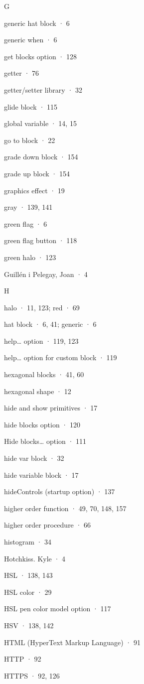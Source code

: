 G

generic hat block · 6

generic when · 6

get blocks option · 128

getter · 76

getter/setter library · 32

glide block · 115

global variable · 14, 15

go to block · 22

grade down block · 154

grade up block · 154

graphics effect · 19

gray · 139, 141

green flag · 6

green flag button · 118

green halo · 123

Guillén i Pelegay, Joan · 4

H

halo · 11, 123; red · 69

hat block · 6, 41; generic · 6

help\ldots{} option · 119, 123

help\ldots{} option for custom block · 119

hexagonal blocks · 41, 60

hexagonal shape · 12

hide and show primitives · 17

hide blocks option · 120

Hide blocks\ldots{} option · 111

hide var block · 32

hide variable block · 17

hideControls (startup option) · 137

higher order function · 49, 70, 148, 157

higher order procedure · 66

histogram · 34

Hotchkiss. Kyle · 4

HSL · 138, 143

HSL color · 29

HSL pen color model option · 117

HSV · 138, 142

HTML (HyperText Markup Language) · 91

HTTP · 92

HTTPS · 92, 126

